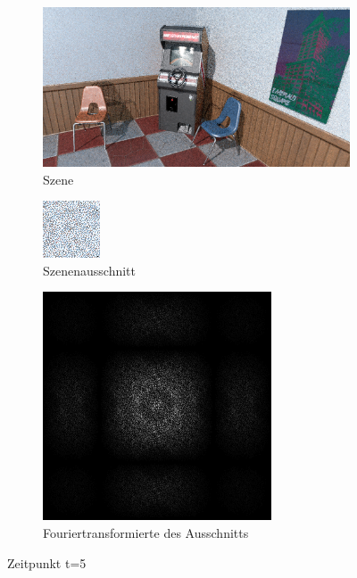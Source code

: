 \begin{figure}[H]
    \begin{subfigure}{\textwidth}   
        \centering \includegraphics[scale=.25]{content/TemporalerAlg/Bilder/Sorting/Screenshots/seed_debug_7.0_selection.png}
        \caption{Szene}
        \label{fig:Nur_Sorting_Szene_t5}
    \end{subfigure}
    \begin{subfigure}{0.5\textwidth}
        \centering\includegraphics[width=0.4\linewidth]{content/TemporalerAlg/Bilder/Sorting/Screenshots/seed_debug_7.0_ausschnitt.png} 
        \caption{Szenenausschnitt}
        \label{fig:Nur_Sorting_ausschnitt_t5}
    \end{subfigure}
    \begin{subfigure}{0.5\textwidth}
        \centering\includegraphics[width=0.4\linewidth]{content/TemporalerAlg/Bilder/Sorting/Screenshots/Spektren/seed_debug_7.0_ausschnitt.png}
        \caption{Fouriertransformierte des Ausschnitts}
        \label{fig:Nur_Sorting_Fouriertransformierte_t5}
    \end{subfigure}
        \caption{Zeitpunkt t=5}
        \label{fig:Nur_Sorting_Verlauf_t5}
\end{figure}

